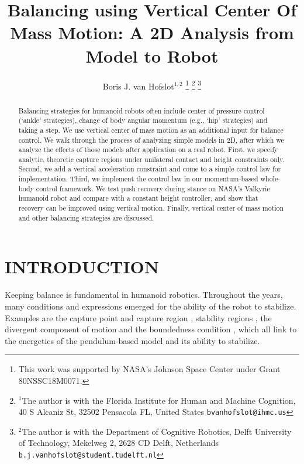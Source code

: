 \documentclass[letterpaper, 10 pt, conference]{ieeeconf}  %
\title{\LARGE \bf
Balancing using Vertical Center Of Mass Motion: A 2D Analysis from Model to Robot
}
\author{Boris J. van Hofslot$^{1,2}$%
\thanks{This work was supported by NASA's Johnson Space Center under Grant 80NSSC18M0071.}%
\thanks{$^{1}$The author is with the Florida Institute for Human and Machine Cognition, 40 S Alcaniz St, 32502 Pensacola FL, United States
        {\tt\small bvanhofslot@ihmc.us}}%
\thanks{$^{2}$The author is with the Department of Cognitive Robotics, Delft University of Technology, Mekelweg 2, 2628 CD Delft, Netherlands
        {\tt\small b.j.vanhofslot@student.tudelft.nl}}%
}
\begin{document}
\maketitle
\thispagestyle{empty}
\pagestyle{empty}



\begin{abstract}
Balancing strategies for humanoid robots often include center of pressure control (`ankle' strategies), change of body angular momentum (e.g., `hip' strategies) and taking a step. We use vertical center of mass motion as an additional input for balance control. We walk through the process of analyzing simple models in 2D, after which we analyze the effects of those models after application on a real robot. First, we specify analytic, theoretic capture regions under unilateral contact and height constraints only. Second, we add a vertical acceleration constraint and come to a simple control law for implementation. Third, we implement the control law in our momentum-based whole-body control framework. We test push recovery during stance on NASA's Valkyrie humanoid robot and compare with a constant height controller, and show that recovery can be improved using vertical motion. Finally, vertical center of mass motion and other balancing strategies are discussed.
\end{abstract}



\section{INTRODUCTION}
Keeping balance is fundamental in humanoid robotics. Throughout the years, many conditions and expressions emerged for the ability of the robot to stabilize. Examples are the capture point and capture region \cite{pratt2006capture, koolen2012capturability}, stability regions \cite{stephens2007humanoid}, the divergent component of motion \cite{takenaka2009real} and the boundedness condition \cite{lanari2014boundedness}, which all link to the energetics of the pendulum-based model and its ability to stabilize.
\end{document}
